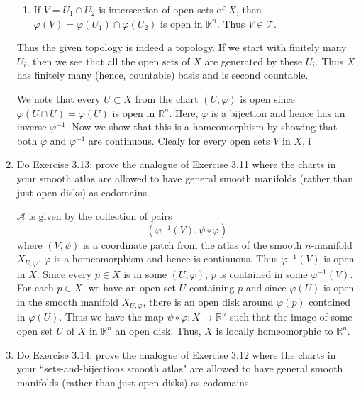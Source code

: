 \documentclass[12pt]{article}
\newcommand{\rl}{\mathbb{R}}
\newcommand{\atlasA}{\mathcal{A}}
\begin{document}
\begin{enumerate}
\begin{mybox}
\begin{enumerate}
        \item If $V=U_1\cap U_2$ is intersection of open
        sets of $X$, then $\varphi(V)=\varphi(U_1)\cap
        \varphi(U_2)$ is open in $\rl^n$. Thus
        $V\in\mathscr{T}$.
    \end{enumerate}
    Thus the given topology is indeed a topology. If we
    start with finitely many $U_i$, then we see that all the
    open sets of $X$ are generated by these $U_i$. Thus $X$
    has finitely many (hence, countable) basis and is
    second countable.

    \vspace*{2mm}
    We note that every $U \subset X$ from the chart
    $(U,\varphi)$
    is open since $\varphi(U\cap U)=\varphi(U)$ is open
    in $\rl^n$. Here, $\varphi$ is a bijection and hence has
    an inverse $\varphi^{-1}$. Now we show that this is a
    homeomorphism by showing that both $\varphi$ and
    $\varphi^{-1}$ are continuous. Clealy for every open sets
    $V$ in $X$, i

\end{mybox}
 
 
\item Do Exercise 3.13: prove the analogue of Exercise
    3.11 where the charts in your smooth atlas are allowed
    to have general smooth manifolds (rather than just
    open disks) as codomains.

\begin{mybox}

    $\atlasA$ is given by the collection of pairs
    $$(\varphi^{-1}(V),\psi\circ\varphi)$$
    where $(V,\psi)$ is a coordinate patch from the atlas
    of the smooth $n$-manifold $X_{U,\varphi}$. $\varphi$ is
    a homeomorphism and hence is continuous. Thus $\varphi^{-1}
    (V)$ is open in $X$. Since
    every $p\in X$ is in some $(U,\varphi)$, $p$ is contained
    in some $\varphi^{-1}(V)$. For each $p\in X$, we have
    an open set $U$ containing $p$ and since $\varphi(U)$ is
    open in the smooth manifold $X_{U,\varphi}$, there is
    an open disk around $\varphi(p)$ contained in $\varphi(U)$.
    Thus we have the map
    $\psi\circ\varphi:X\to\rl^n$ such that the image of
    some open set $U$ of $X$ in $\rl^n$
    an open disk. Thus, $X$ is locally homeomorphic to
    $\rl^n$.

\end{mybox}

\item Do Exercise 3.14: prove the analogue of Exercise
    3.12 where the charts in your ``sets-and-bijections
    smooth atlas" are allowed to have general smooth
    manifolds (rather than just open disks) as codomains.

\begin{mybox}

\end{mybox}

\end{enumerate}
\end{document}
